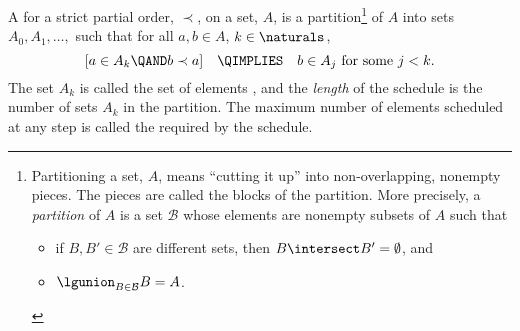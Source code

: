 \begin{definition}\label{def:schedule}
A  for a strict partial order, $\prec$, on a set,
$A$, is a partition\footnote{Partitioning a set,
$A$, means ``cutting it up'' into non-overlapping, nonempty pieces.  The
pieces are called the blocks of the partition.  More precisely, a
\emph{partition} of $A$ is a set $\mathcal{B}$ whose elements are nonempty
subsets of $A$ such that
\begin{itemize}
\item if $B,B' \in \mathcal{B}$ are different sets, then $B \intersect B' =
 \emptyset$, and
\item $\lgunion_{B\in \mathcal{B}} B = A$.
\end{itemize}} of $A$ into sets $A_0, A_1,\dots,$ such
that for all $a,b \in A$, $k \in \naturals$,
\[
[a \in A_k \QAND b \prec a] \quad\QIMPLIES\quad b \in A_j \text{ for some } j < k.
\]
The set $A_k$ is called the set of
elements , and the \emph{length} of the
schedule is the number of sets $A_k$ in the partition.  The maximum
number of elements scheduled at any step is called the  required by the schedule.
\end{definition}

\iffalse

So the schedule we chose above for clothes has four steps
\begin{align*}
A_0 = & \set{\text{leftsock, rightsock, underwear, shirt}},\\
A_1 = & \set{\text{pants, sweater}},\\
A_2 = & \set{\text{leftshoe, rightshoe, belt}},\\
A_3 = & \set{\text{jacket}}.
\end{align*}
and requires four processors (to complete the first step).

Notice that the dependencies constrain the tasks underwear, pants,
belt, and jacket to be done in sequence.  This implies
that at least four steps are needed in \emph{every} schedule for
getting dressed, since if we used fewer than four steps, two of these
tasks would have to be scheduled at the same time.  A set of tasks
that must be done in sequence like this is called a \emph{chain}.

\begin{definition}
A \term{chain} in a partial order is a set of elements such that any
two different elements in the set are comparable.  A chain is said to
\index{end of chain}\emph{end at} its maximum element.
\end{definition}
\fi

